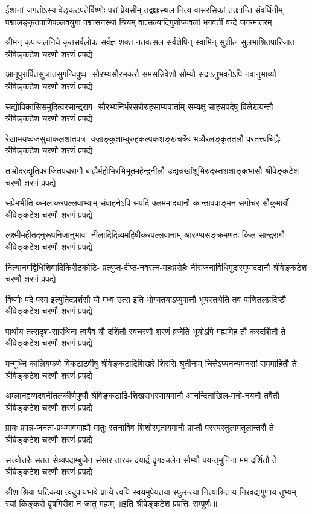 
\fourlineindentedshloka
{ईशानां जगतोऽस्य वेङ्कटपतेर्विष्णोः परां प्रेयसीम्}
{तद्वक्षःस्थल-नित्य-वासरसिकां तत्क्षान्ति संवर्धिनीम्}
{पद्मालङ्कृतपाणिपल्लवयुगां पद्मासनस्थां श्रियम्}
{वात्सल्यादिगुणोज्ज्वलां भगवतीं वन्दे जगन्मातरम्}

\fourlineindentedshloka
{श्रीमन् कृपाजलनिधे कृतसर्वलोक}
{सर्वज्ञ शक्त नतवत्सल सर्वशेषिन्}
{स्वामिन् सुशील सुलभाश्रितपारिजात}
{श्रीवेङ्कटेश चरणौ शरणं प्रपद्ये}

\fourlineindentedshloka
{आनूपुरार्पितसुजातसुगन्धिपुष्प-}
{सौरभ्यसौरभकरौ समसन्निवेशौ}
{सौम्यौ सदाऽनुभवनेऽपि नवानुभाव्यौ}
{श्रीवेङ्कटेश चरणौ शरणं प्रपद्ये}

\fourlineindentedshloka
{सद्योविकासिसमुदित्वरसान्द्रराग-}
{सौरभ्यनिर्भरसरोरुहसाम्यवार्ताम्}
{सम्यक्षु साहसपदेषु विलेखयन्तौ}
{श्रीवेङ्कटेश चरणौ शरणं प्रपद्ये}

\fourlineindentedshloka
{रेखामयध्वजसुधाकलशातपत्र-}
{वज्राङ्कुशाम्बुरुहकल्पकशङ्खचक्रैः}
{भव्यैरलङ्कृततलौ परतत्त्वचिह्नैः}
{श्रीवेङ्कटेश चरणौ शरणं प्रपद्ये}

\fourlineindentedshloka
{ताम्रोदरद्युतिपराजितपद्मरागौ}
{बाह्यैर्महोभिरभिभूतमहेन्द्रनीलौ}
{उद्यन्नखांशुभिरुदस्तशशाङ्कभासौ}
{श्रीवेङ्कटेश चरणौ शरणं प्रपद्ये}

\fourlineindentedshloka
{सप्रेमभीति कमलाकरपल्लवाभ्याम्}
{संवाहनेऽपि सपदि क्लममादधानौ}
{कान्ताववाङ्मन-सगोचर-सौकुमार्यौ}
{श्रीवेङ्कटेश चरणौ शरणं प्रपद्ये}

\fourlineindentedshloka
{लक्ष्मीमहीतदनुरूपनिजानुभाव-}
{नीलादिदिव्यमहिषीकरपल्लवानाम्}
{आरुण्यसङ्क्रमणतः किल सान्द्ररागौ}
{श्रीवेङ्कटेश चरणौ शरणं प्रपद्ये}

\fourlineindentedshloka
{नित्यानमद्विधिशिवादिकिरीटकोटि-}
{प्रत्युप्त-दीप्त-नवरत्न-महःप्ररोहैः}
{नीराजनाविधिमुदारमुपाददानौ}
{श्रीवेङ्कटेश चरणौ शरणं प्रपद्ये}

\fourlineindentedshloka
{विष्णोः पदे परम इत्युतिदप्रशंसौ}
{यौ मध्व उत्स इति भोग्यतयाऽप्युपात्तौ}
{भूयस्तथेति तव पाणितलप्रदिष्टौ}
{श्रीवेङ्कटेश चरणौ शरणं प्रपद्ये}

\fourlineindentedshloka
{पार्थाय तत्सदृश-सारथिना त्वयैव}
{यौ दर्शितौ स्वचरणौ शरणं व्रजेति}
{भूयोऽपि मह्यमिह तौ करदर्शितौ ते}
{श्रीवेङ्कटेश चरणौ शरणं प्रपद्ये}

\fourlineindentedshloka
{मन्मूर्ध्नि कालियफणे विकटाटवीषु}
{श्रीवेङ्कटाद्रिशिखरे शिरसि श्रुतीनाम्}
{चित्तेऽप्यनन्यमनसां सममाहितौ ते}
{श्रीवेङ्कटेश चरणौ शरणं प्रपद्ये}

\fourlineindentedshloka
{अम्लानहृष्यदवनीतलकीर्णपुष्पौ}
{श्रीवेङ्कटाद्रि-शिखराभरणायमानौ}
{आनन्दिताखिल-मनो-नयनौ तवैतौ}
{श्रीवेङ्कटेश चरणौ शरणं प्रपद्ये}

\fourlineindentedshloka
{प्रायः प्रपन्न-जनता-प्रथमावगाह्यौ}
{मातुः स्तनाविव शिशोरमृतायमानौ}
{प्राप्तौ परस्परतुलामतुलान्तरौ ते}
{श्रीवेङ्कटेश चरणौ शरणं प्रपद्ये}

\fourlineindentedshloka
{सत्त्वोत्तरैः सतत-सेव्यपदाम्बुजेन}
{संसार-तारक-दयार्द्र-दृगञ्चलेन}
{सौम्यौ पयन्तृमुनिना मम दर्शितौ ते}
{श्रीवेङ्कटेश चरणौ शरणं प्रपद्ये}

\fourlineindentedshloka
{श्रीश श्रिया घटिकया त्वदुपायभावे}
{प्राप्ये त्वयि स्वयमुपेयतया स्फुरन्त्या}
{नित्याश्रिताय निरवद्यगुणाय तुभ्यम्}
{स्यां किङ्करो वृषगिरीश न जातु मह्यम्}
॥इति श्रीवेङ्कटेश प्रपत्तिः सम्पूर्णः॥